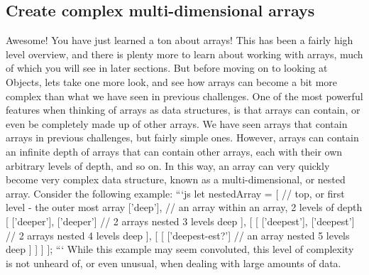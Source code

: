 \documentclass{article}%
\begin{document}
\subsection{Create complex multi{-}dimensional arrays}%
\label{subsec:Createcomplexmulti{-}dimensionalarrays}%
Awesome! You have just learned a ton about arrays! This has been a fairly high level overview, and there is plenty more to learn about working with arrays, much of which you will see in later sections. But before moving on to looking at Objects, lets take one more look, and see how arrays can become a bit more complex than what we have seen in previous challenges.\newline%
One of the most powerful features when thinking of arrays as data structures, is that arrays can contain, or even be completely made up of other arrays. We have seen arrays that contain arrays in previous challenges, but fairly simple ones. However, arrays can contain an infinite depth of arrays that can contain other arrays, each with their own arbitrary levels of depth, and so on. In this way, an array can very quickly become very complex data structure, known as a multi{-}dimensional, or nested array. Consider the following example:\newline%
```js\newline%
let nestedArray = {[} // top, or first level {-} the outer most array\newline%
  {[}'deep'{]}, // an array within an array, 2 levels of depth\newline%
  {[}\newline%
    {[}'deeper'{]}, {[}'deeper'{]} // 2 arrays nested 3 levels deep\newline%
  {]},\newline%
  {[}\newline%
    {[}\newline%
      {[}'deepest'{]}, {[}'deepest'{]} // 2 arrays nested 4 levels deep\newline%
    {]},\newline%
    {[}\newline%
      {[}\newline%
        {[}'deepest{-}est?'{]} // an array nested 5 levels deep\newline%
      {]}\newline%
    {]}\newline%
  {]}\newline%
{]};\newline%
```\newline%
While this example may seem convoluted, this level of complexity is not unheard of, or even unusual, when dealing with large amounts of data.\newline%
\end{document}
